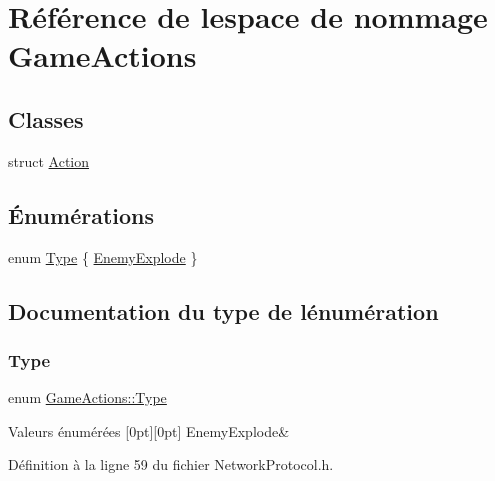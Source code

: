 \hypertarget{namespace_game_actions}{}\section{Référence de l\textquotesingle{}espace de nommage Game\+Actions}
\label{namespace_game_actions}
\subsection*{Classes}
\begin{DoxyCompactItemize}
\item 
struct \hyperlink{struct_game_actions_1_1_action}{Action}
\end{DoxyCompactItemize}
\subsection*{Énumérations}
\begin{DoxyCompactItemize}
\item 
enum \hyperlink{namespace_game_actions_a2c10fdbcc811f03c02f357cdd0c4e76d}{Type} \{ \hyperlink{namespace_game_actions_a2c10fdbcc811f03c02f357cdd0c4e76da1e615e680b4b8d9a0303029d1730179e}{Enemy\+Explode}
 \}
\end{DoxyCompactItemize}


\subsection{Documentation du type de l\textquotesingle{}énumération}
\hypertarget{namespace_game_actions_a2c10fdbcc811f03c02f357cdd0c4e76d}{}\label{namespace_game_actions_a2c10fdbcc811f03c02f357cdd0c4e76d} 
\subsubsection{\texorpdfstring{Type}{Type}}
{\footnotesize\ttfamily enum \hyperlink{namespace_game_actions_a2c10fdbcc811f03c02f357cdd0c4e76d}{Game\+Actions\+::\+Type}}

\begin{DoxyEnumFields}{Valeurs énumérées}
[0pt][0pt]{}\hypertarget{namespace_game_actions_a2c10fdbcc811f03c02f357cdd0c4e76da1e615e680b4b8d9a0303029d1730179e}{}\label{namespace_game_actions_a2c10fdbcc811f03c02f357cdd0c4e76da1e615e680b4b8d9a0303029d1730179e} 
Enemy\+Explode&\\
\hline

\end{DoxyEnumFields}


Définition à la ligne 59 du fichier Network\+Protocol.\+h.

